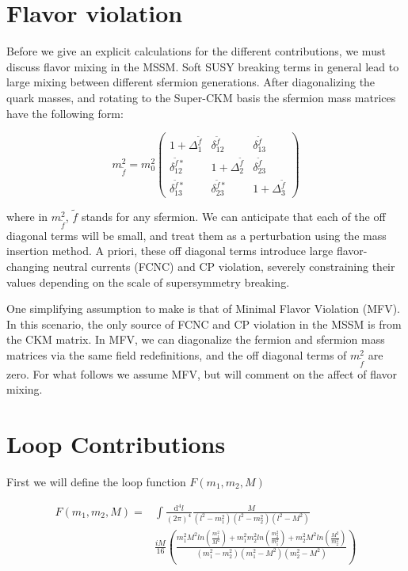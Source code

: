 \documentclass[aps,onecolumn,twoside,secnumarabic,balancelastpage,amsmath,amssymb,nofootinbib,hyperref=pdftex]{revtex4}
\begin{document}
\section{Flavor violation}

Before we give an explicit calculations for the different contributions, we must discuss flavor mixing in the MSSM. Soft SUSY breaking terms in general lead to large mixing between different sfermion generations. After diagonalizing the quark masses, and rotating to the Super-CKM basis the sfermion mass matrices have the following form:

\[
m_{\tilde{f}}^2 = m_{0}^{2}
  \begin{pmatrix}
    1 + \Delta_{1}^{\tilde{f}} & \delta_{12}^{\tilde{f}} & \delta_{13}^{\tilde{f}}\\
     \delta_{12}^{\tilde{f}*} & 1 + \Delta_{2}^{\tilde{f}} & \delta_{23}^{\tilde{f}}\\
      \delta_{13}^{\tilde{f}*} & \delta_{23}^{\tilde{f}*} & 1 + \Delta_{3}^{\tilde{f}}
  \end{pmatrix}
\]

where in $m_{\tilde{f}}^2$, $\tilde{f}$ stands for any sfermion. We can anticipate that each of the off diagonal terms will be small, and treat them as a perturbation using the mass insertion method. A priori, these off diagonal terms introduce large flavor-changing neutral currents (FCNC) and CP violation, severely constraining their values depending on the scale of supersymmetry breaking. 


One simplifying assumption to make is that of Minimal Flavor Violation (MFV). In this scenario, the only source of FCNC and CP violation in the MSSM is from the CKM matrix. In MFV, we can diagonalize the fermion and sfermion mass matrices via the same field redefinitions, and the off diagonal terms of $m_{\tilde{f}}^2$ are zero. For what follows we assume MFV, but will comment on the affect of flavor mixing.

\section{Loop Contributions}

First we will define the loop function $F(m_{1},m_{2},M)$

\begin{align}
F(m_{1},m_{2},M) = &\int \frac{\text{d}^{4}l}{(2\pi)^{4}} \frac{M}{(l^2 - m_{1}^{2})(l^2 - m_{2}^{2})(l^2 - M^{2})}\nonumber \\
&\frac{iM}{16}\left(\frac{m_{1}^{2}M^{2}ln(\frac{m_{1}^{2}}{M^{2}}) + m_{1}^{2}m_{2}^{2}ln(\frac{m_{2}^{2}}{m_{1}^{2}}) + m_{2}^{2}M^{2}ln(\frac{M^{2}}{m_{2}^{2}})}{(m_{1}^{2} - m_{2}^{2})(m_{1}^{2} - M^{2})(m_{2}^{2} - M^{2})}\right)
\end{align}
\end{document}
